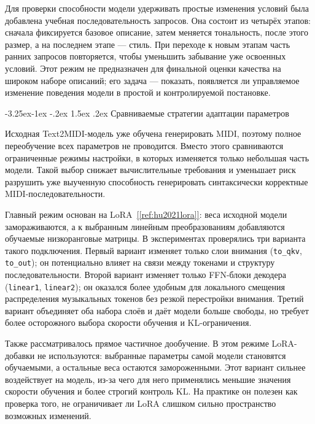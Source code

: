 \documentclass[a4paper,12pt]{extarticle}
\makeatletter
\newcommand{\sourcecite}[1]{\hyperref[#1]{[\ref*{#1}]}}
\renewcommand\subsection{\@startsection{subsection}{2}{\z@}%
  {-3.25ex\@plus -1ex \@minus -.2ex}%
  {1.5ex \@plus .2ex}%
  {\normalfont\large\bfseries\Needspace{6\baselineskip}}}
\makeatother
\begin{document}
Для проверки способности модели удерживать простые изменения условий была
добавлена учебная последовательность запросов. Она состоит из четырёх
этапов: сначала фиксируется базовое описание, затем меняется тональность,
после этого размер, а на последнем этапе --- стиль. При переходе к новым
этапам часть ранних запросов повторяется, чтобы уменьшить забывание уже
освоенных условий. Этот режим не предназначен для финальной оценки качества
на широком наборе описаний; его задача --- показать, появляется ли управляемое
изменение поведения модели в простой и контролируемой постановке.

\subsection{Сравниваемые стратегии адаптации параметров}

Исходная Text2MIDI-модель уже обучена генерировать MIDI, поэтому полное
переобучение всех параметров не проводится. Вместо этого сравниваются
ограниченные режимы настройки, в которых изменяется только небольшая часть
модели. Такой выбор снижает вычислительные требования и уменьшает риск разрушить уже
выученную способность генерировать синтаксически корректные
MIDI-последовательности.

Главный режим основан на LoRA~\sourcecite{ref:hu2021lora}: веса исходной модели
замораживаются, а к выбранным линейным преобразованиям добавляются обучаемые
низкоранговые матрицы. В экспериментах проверялись три варианта такого
подключения. Первый вариант изменяет только слои внимания
(\texttt{to\_qkv}, \texttt{to\_out}); он потенциально влияет на связи между
токенами и структуру последовательности. Второй вариант изменяет только
FFN-блоки декодера (\texttt{linear1}, \texttt{linear2}); он оказался
более удобным для локального смещения распределения музыкальных токенов без
резкой перестройки внимания. Третий вариант объединяет оба набора слоёв и
даёт модели больше свободы, но требует более осторожного выбора скорости
обучения и KL-ограничения.

Также рассматривалось прямое частичное дообучение. В этом режиме
LoRA-добавки не используются: выбранные параметры самой модели становятся
обучаемыми, а остальные веса остаются замороженными. Этот вариант сильнее
воздействует на модель, из-за чего для него применялись меньшие значения скорости обучения и
более строгий контроль KL. На практике он полезен как проверка того, не
ограничивает ли LoRA слишком сильно пространство возможных изменений.
\end{document}

